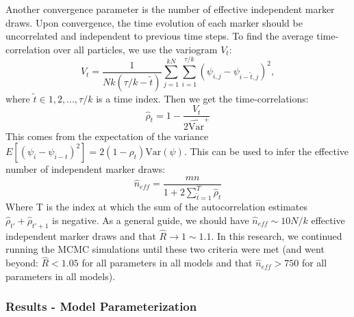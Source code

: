 \documentclass[
]{article}
\begin{document}
Another convergence parameter is the number of effective independent marker draws. Upon convergence, the time evolution of each marker should be uncorrelated and independent to previous time steps. To find the average time-correlation over all particles, we use the variogram \(V_t\):
\begin{equation}
  V_t=\frac{1}{Nk(\tau/k-\tilde{t})}\sum_{j=1}^{kN}\sum_{i=1}^{\tau/k}(\psi_{i,j}-\psi_{i-\tilde{t},j})^2,
\end{equation}
where \(\tilde{t}\in 1,2,...,\tau/k\) is a time index. Then we get the time-correlations:
\begin{equation}
  \hat{\rho}_t=1-\frac{V_t}{2\hat{\text{Var}}^+}
\end{equation}
This comes from the expectation of the variance \(E[(\psi_i-\psi_{i-t})^2]=2(1-\rho_t)\text{Var}(\psi)\). This can be used to infer the effective number of independent marker draws:
\begin{equation}
  \hat{n}_{eff}=\frac{mn}{1+2\sum_{\tilde{t}=1}^T\hat{\rho}_t}
\end{equation}
Where T is the index at which the sum of the autocorrelation estimates \(\hat{\rho}_{t'}+\hat{\rho}_{t'+1}\) is negative. As a general guide, we should have \(\hat{n}_{eff}\sim 10N/k\) effective independent marker draws and that \(\hat{R}\to 1\sim 1.1\). In this research, we continued running the MCMC simulations until these two criteria were met (and went beyond: \(\hat{R}<1.05\) for all parameters in all models and that \(\hat{n}_{eff}>750\) for all parameters in all models).

\hypertarget{results---model-parameterization}{%
\subsubsection{Results - Model Parameterization}\label{results---model-parameterization}}
\end{document}
